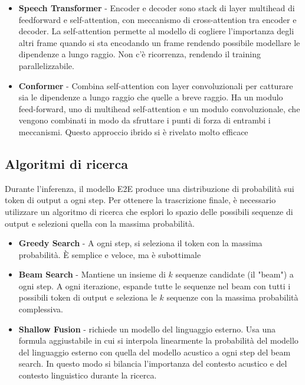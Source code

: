 \documentclass[12pt, a4paper]{article}
\begin{document}
\begin{itemize}
  \item \textbf{Speech Transformer} - Encoder e decoder sono stack di layer multihead di feedforward e self-attention, con meccanismo di cross-attention tra encoder e decoder. La self-attention permette al modello di cogliere l'importanza degli altri frame quando si sta encodando un frame rendendo possibile modellare le dipendenze a lungo raggio. Non c'è ricorrenza, rendendo il training parallelizzabile.
  \item \textbf{Conformer} - Combina self-attention con layer convoluzionali per catturare sia le dipendenze a lungo raggio che quelle a breve raggio. Ha un modulo feed-forward, uno di multihead self-attention e un modulo convoluzionale, che vengono combinati in modo da sfruttare i punti di forza di entrambi i meccanismi. Questo approccio ibrido si è rivelato molto efficace
\end{itemize}

\subsection{Algoritmi di ricerca}

Durante l'inferenza, il modello E2E produce una distribuzione di probabilità sui token di output a ogni step. Per ottenere la trascrizione finale, è necessario utilizzare un algoritmo di ricerca che esplori lo spazio delle possibili sequenze di output e selezioni quella con la massima probabilità.

\begin{itemize}
  \item \textbf{Greedy Search} - A ogni step, si seleziona il token con la massima probabilità. È semplice e veloce, ma è subottimale
  \item \textbf{Beam Search} - Mantiene un insieme di $k$ sequenze candidate (il "beam") a ogni step. A ogni iterazione, espande tutte le sequenze nel beam con tutti i possibili token di output e seleziona le $k$ sequenze con la massima probabilità complessiva.
  \item \textbf{Shallow Fusion} - richiede un modello del linguaggio esterno. Usa una formula aggiustabile in cui si interpola linearmente la probabilità del modello del linguaggio esterno con quella del modello acustico a ogni step del beam search. In questo modo si bilancia l'importanza del contesto acustico e del contesto linguistico durante la ricerca.
\end{itemize}
\end{document}
